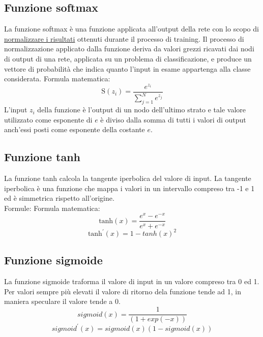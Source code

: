 \subsection{Funzione softmax}
La funzione softmax è una funzione applicata all'output della rete con lo scopo di \underline{normalizzare i risultati} ottenuti durante il processo di training. Il processo di normalizzazione applicato dalla funzione deriva da valori grezzi ricavati dai nodi di output di una rete, applicata su un problema di classificazione, e produce un vettore di probabilità che indica quanto l'input in esame appartenga alla classe considerata. Formula matematica:
\begin{equation}
\text{S}(z_i) = \frac{e^{z_i}}{\sum_{j=1}^{N} e^{z_j}}
\end{equation}
L'input $z_i$ della funzione è l'output di un nodo dell'ultimo strato e tale valore utilizzato come esponente di $e$ è diviso dalla somma di tutti i valori di output anch'essi posti come esponente della costante $e$.
\subsection{Funzione tanh}
La funzione tanh calcola la tangente iperbolica del valore di input. La tangente iperbolica è una funzione che mappa i valori in un intervallo compreso tra -1 e 1 ed è simmetrica rispetto all'origine.\\
Formule:
Formula matematica:
\begin{equation}
\text{tanh}(x) = \frac{e^x - e^{-x}}{e^x + e^{-x}} 
\end{equation}
\begin{equation}
\text{tanh}^{\prime}(x) = 1 - tanh(x)^2
\end{equation}
\subsection{Funzione sigmoide}
La funzione sigmoide traforma il valore di input in un valore compreso tra 0 ed 1. Per valori sempre più elevati il valore di ritorno dela funzione tende ad 1, in maniera speculare il valore tende a 0.
\begin{equation}
sigmoid(x) = \frac{1}{(1 + exp(-x))}
\end{equation}
\begin{equation}
sigmoid^{\prime}(x) = sigmoid(x)(1 - sigmoid(x))
\end{equation}
